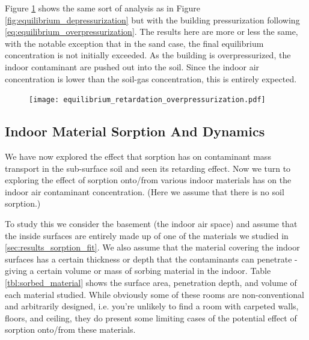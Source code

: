Figure \ref{fig:equilibrium_overpressurization} shows the same sort of analysis as in Figure \ref{fig:equilibrium_depressurization} but with the building pressurization following \eqref{eq:equilibrium_overpressurization}.
The results here are more or less the same, with the notable exception that in the sand case, the final equilibrium concentration is not initially exceeded.
As the building is overpressurized, the indoor contaminant are pushed out into the soil.
Since the indoor air concentration is lower than the soil-gas concentration, this is entirely expected.\par

\begin{figure}[!htb]
  \texttt{[image: equilibrium\_retardation\_overpressurization.pdf]}
  \caption{}
  \label{fig:equilibrium_overpressurization}
\end{figure}


\subsection{Indoor Material Sorption And Dynamics}\label{sec:results_indoor_sorption}

We have now explored the effect that sorption has on contaminant mass transport in the sub-surface soil and seen its retarding effect.
Now we turn to exploring the effect of sorption onto/from various indoor materials has on the indoor air contaminant concentration.
(Here we assume that there is no soil sorption.)\par

To study this we consider the basement (the indoor air space) and assume that the inside surfaces are entirely made up of one of the materials we studied in \ref{sec:results_sorption_fit}.
We also assume that the material covering the indoor surfaces has a certain thickness or depth that the contaminants can penetrate - giving a certain volume or mass of sorbing material in the indoor.
Table \ref{tbl:sorbed_material} shows the surface area, penetration depth, and volume of each material studied.
While obviously some of these rooms are non-conventional and arbitrarily designed, i.e. you're unlikely to find a room with carpeted walls, floors, and ceiling, they do present some limiting cases of the potential effect of sorption onto/from these materials.\par

